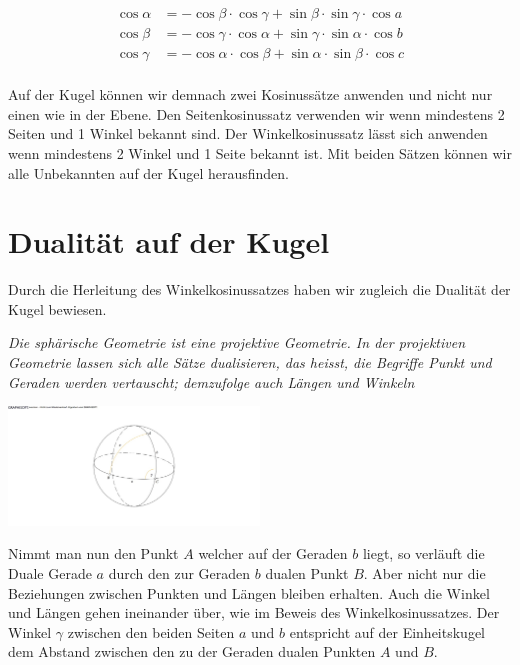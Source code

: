 \begin{refsection}
\begin{refsection}
\begin{align*}
{\cos \alpha} &= {-\cos \beta} \cdot {\cos \gamma} + {\sin \beta} \cdot {\sin \gamma} \cdot {\cos a}\\
{\cos \beta} &= {-\cos \gamma} \cdot {\cos \alpha} + {\sin \gamma} \cdot {\sin \alpha} \cdot {\cos b}\\
{\cos \gamma} &= {-\cos \alpha} \cdot {\cos \beta} + {\sin \alpha} \cdot {\sin \beta} \cdot {\cos c}\\
\end{align*}

Auf der Kugel können wir demnach zwei Kosinussätze anwenden und nicht nur einen wie in der Ebene. Den Seitenkosinussatz verwenden wir wenn mindestens 2 Seiten und 1 Winkel bekannt sind. Der Winkelkosinussatz lässt sich anwenden wenn mindestens 2 Winkel und 1 Seite bekannt ist. Mit beiden Sätzen können wir alle Unbekannten auf der Kugel herausfinden.



\section{Dualität auf der Kugel}

Durch die Herleitung des Winkelkosinussatzes haben wir zugleich die Dualität der Kugel bewiesen.

\begin{satz}\textit{Die sphärische Geometrie ist eine projektive Geometrie. In der projektiven Geometrie lassen sich alle Sätze dualisieren, das heisst, die Begriffe Punkt und Geraden werden vertauscht; demzufolge auch Längen und Winkeln}
\label{skript:kugel:satz:Dualitaet}
\end{satz}

\begin{center}
        \includegraphics[width=0.5\textwidth]{kugel/1Dualitat.jpg}
\end{center}

Nimmt man nun den Punkt $A$ welcher auf der Geraden $b$ liegt, so verläuft die Duale Gerade $a$ durch den zur Geraden $b$ dualen Punkt $B$. 
Aber nicht nur die Beziehungen zwischen Punkten und Längen bleiben erhalten. Auch die Winkel und Längen gehen ineinander über, wie im Beweis des Winkelkosinussatzes.
Der Winkel $\gamma$ zwischen den beiden Seiten $a$ und $b$ entspricht auf der Einheitskugel dem Abstand zwischen den zu der Geraden dualen Punkten $A$ und $B$.




\end{refsection}
\end{refsection}
